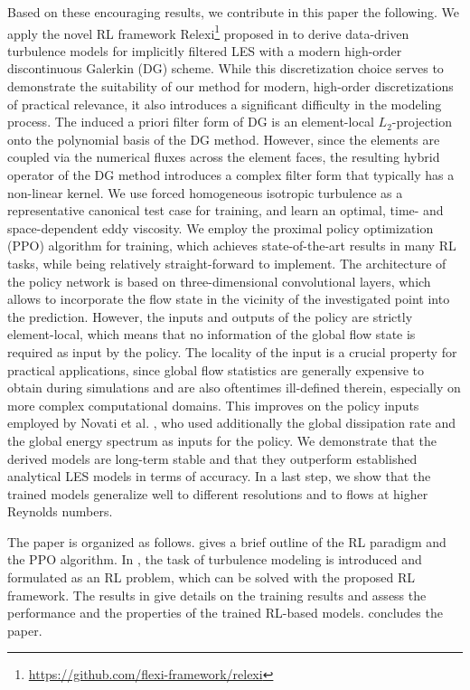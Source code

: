 Based on these encouraging results, we contribute in this paper the following.
We apply the novel RL framework Relexi\footnote{\url{https://github.com/flexi-framework/relexi}} proposed in \cite{kurz2022deep,kurz2022relexi} to derive data-driven turbulence models for implicitly filtered LES with a modern high-order discontinuous Galerkin (DG) scheme.
While this discretization choice serves to demonstrate the suitability of our method for modern, high-order discretizations of practical relevance, it also introduces a significant difficulty in the modeling process.
The induced a priori filter form of DG is an element-local $L_2$-projection onto the polynomial basis of the DG method.
However, since the elements are coupled via the numerical fluxes across the element faces, the resulting hybrid operator of the DG method introduces a complex filter form that typically has a non-linear kernel.
We use forced homogeneous isotropic turbulence as a representative canonical test case for training, and learn an optimal, time- and space-dependent eddy viscosity.
We employ the proximal policy optimization (PPO) algorithm for training, which achieves state-of-the-art results in many RL tasks, while being relatively straight-forward to implement.
The architecture of the policy network is based on three-dimensional convolutional layers, which allows to incorporate the flow state in the vicinity of the investigated point into the prediction.
However, the inputs and outputs of the policy are strictly element-local, which means that no information of the global flow state is required as input by the policy.
The locality of the input is a crucial property for practical applications, since global flow statistics are generally expensive to obtain during simulations and are also oftentimes ill-defined therein, especially on more complex computational domains.
This improves on the policy inputs employed by Novati et al. \cite{novati2021automating}, who used additionally the global dissipation rate and the global energy spectrum as inputs for the policy.
We demonstrate that the derived models are long-term stable and that they outperform established analytical LES models in terms of accuracy.
In a last step, we show that the trained models generalize well to different resolutions and to flows at higher Reynolds numbers.

The paper is organized as follows.
 gives a brief outline of the RL paradigm and the PPO algorithm.
In , the task of turbulence modeling is introduced and formulated as an RL problem, which can be solved with the proposed RL framework.
The results in  give details on the training results and assess the performance and the properties of the trained RL-based models.
 concludes the paper.
